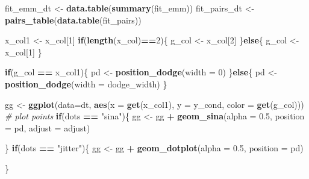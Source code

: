 \documentclass[]{book}
\newenvironment{Shaded}{\begin{snugshade}}{\end{snugshade}}
\newcommand{\CommentTok}[1]{\textcolor[rgb]{0.56,0.35,0.01}{\textit{#1}}}
\newcommand{\ControlFlowTok}[1]{\textcolor[rgb]{0.13,0.29,0.53}{\textbf{#1}}}
\newcommand{\DataTypeTok}[1]{\textcolor[rgb]{0.13,0.29,0.53}{#1}}
\newcommand{\DecValTok}[1]{\textcolor[rgb]{0.00,0.00,0.81}{#1}}
\newcommand{\FloatTok}[1]{\textcolor[rgb]{0.00,0.00,0.81}{#1}}
\newcommand{\KeywordTok}[1]{\textcolor[rgb]{0.13,0.29,0.53}{\textbf{#1}}}
\newcommand{\NormalTok}[1]{#1}
\newcommand{\OperatorTok}[1]{\textcolor[rgb]{0.81,0.36,0.00}{\textbf{#1}}}
\newcommand{\StringTok}[1]{\textcolor[rgb]{0.31,0.60,0.02}{#1}}
\begin{document}
\begin{Shaded}
\begin{Highlighting}[]
{{{\NormalTok{  fit_emm_dt <-}\StringTok{ }\KeywordTok{data.table}\NormalTok{(}\KeywordTok{summary}\NormalTok{(fit_emm))}
\NormalTok{  fit_pairs_dt <-}\StringTok{ }\KeywordTok{pairs_table}\NormalTok{(}\KeywordTok{data.table}\NormalTok{(fit_pairs))}
  
\NormalTok{  x_col1 <-}\StringTok{ }\NormalTok{x_col[}\DecValTok{1}\NormalTok{]}
  \ControlFlowTok{if}\NormalTok{(}\KeywordTok{length}\NormalTok{(x_col)}\OperatorTok{==}\DecValTok{2}\NormalTok{)\{}
\NormalTok{    g_col <-}\StringTok{ }\NormalTok{x_col[}\DecValTok{2}\NormalTok{]}
\NormalTok{  \}}\ControlFlowTok{else}\NormalTok{\{}
\NormalTok{    g_col <-}\StringTok{ }\NormalTok{x_col[}\DecValTok{1}\NormalTok{]}
\NormalTok{  \}}
  
  \ControlFlowTok{if}\NormalTok{(g_col }\OperatorTok{==}\StringTok{ }\NormalTok{x_col1)\{}
\NormalTok{    pd <-}\StringTok{ }\KeywordTok{position_dodge}\NormalTok{(}\DataTypeTok{width =} \DecValTok{0}\NormalTok{)}
\NormalTok{  \}}\ControlFlowTok{else}\NormalTok{\{}
\NormalTok{    pd <-}\StringTok{ }\KeywordTok{position_dodge}\NormalTok{(}\DataTypeTok{width =}\NormalTok{ dodge_width)}
\NormalTok{  \}}
  
\NormalTok{  gg <-}\StringTok{ }\KeywordTok{ggplot}\NormalTok{(}\DataTypeTok{data=}\NormalTok{dt, }\KeywordTok{aes}\NormalTok{(}\DataTypeTok{x =} \KeywordTok{get}\NormalTok{(x_col1),}
                            \DataTypeTok{y =}\NormalTok{ y_cond,}
                            \DataTypeTok{color =} \KeywordTok{get}\NormalTok{(g_col)))}
    \CommentTok{# plot points}
    \ControlFlowTok{if}\NormalTok{(dots }\OperatorTok{==}\StringTok{ "sina"}\NormalTok{)\{}
\NormalTok{      gg <-}\StringTok{ }\NormalTok{gg }\OperatorTok{+}\StringTok{ }\KeywordTok{geom_sina}\NormalTok{(}\DataTypeTok{alpha =} \FloatTok{0.5}\NormalTok{,}
                \DataTypeTok{position =}\NormalTok{ pd,}
                \DataTypeTok{adjust =}\NormalTok{ adjust)}
      
\NormalTok{    \}}
    \ControlFlowTok{if}\NormalTok{(dots }\OperatorTok{==}\StringTok{ "jitter"}\NormalTok{)\{}
\NormalTok{      gg <-}\StringTok{ }\NormalTok{gg }\OperatorTok{+}\StringTok{ }\KeywordTok{geom_dotplot}\NormalTok{(}\DataTypeTok{alpha =} \FloatTok{0.5}\NormalTok{,}
                \DataTypeTok{position =}\NormalTok{ pd)}
      
\NormalTok{    \}}
  
}}}
\end{Highlighting}
\end{Shaded}
\end{document}
